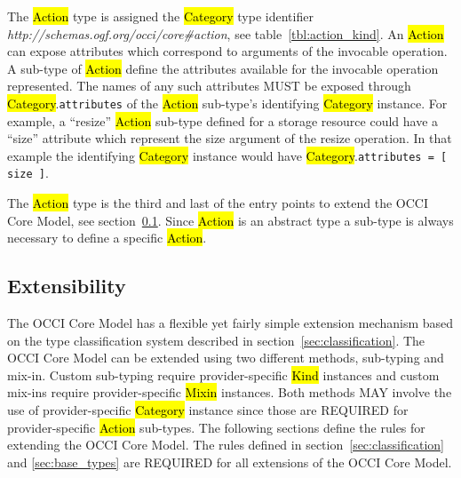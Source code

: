 \documentclass[10pt,a4paper]{article}
\begin{document}
%
The \hl{Action} type is assigned the \hl{Category} type identifier
\textit{http://schemas.ogf.org/occi/core\#action}, see
table~\ref{tbl:action_kind}.
%
An \hl{Action} can expose attributes which correspond to arguments of the
invocable operation.  A sub-type of \hl{Action} define the attributes available
for the invocable operation represented. The names of any such attributes MUST
be exposed through \hl{Category}.{\tt attributes} of the \hl{Action} sub-type's
identifying \hl{Category} instance.
%
For example, a ``resize'' \hl{Action} sub-type defined for a storage resource
could have a ``size'' attribute which represent the size argument of the resize
operation. In that example the identifying \hl{Category} instance would have
\hl{Category}.{\tt attributes = [ size ]}.

The \hl{Action} type is the third and last of the entry points to extend the
OCCI Core Model, see section~\ref{sec:extensibility}. Since \hl{Action} is an
abstract type a sub-type is always necessary to define a specific \hl{Action}.

\subsection{Extensibility}
\label{sec:extensibility}
The OCCI Core Model has a flexible yet fairly simple extension mechanism based on
the type classification system described in section~\ref{sec:classification}.
%
The OCCI Core Model can be extended using two different methods, sub-typing and
mix-in. Custom sub-typing require provider-specific \hl{Kind} instances and
custom mix-ins require provider-specific \hl{Mixin} instances.  Both methods MAY
involve the use of provider-specific \hl{Category} instance since those are
REQUIRED for provider-specific \hl{Action} sub-types.  The following sections
define the rules for extending the OCCI Core Model.
%
The rules defined in section~\ref{sec:classification} and \ref{sec:base_types}
are REQUIRED for all extensions of the OCCI Core Model.
\end{document}

